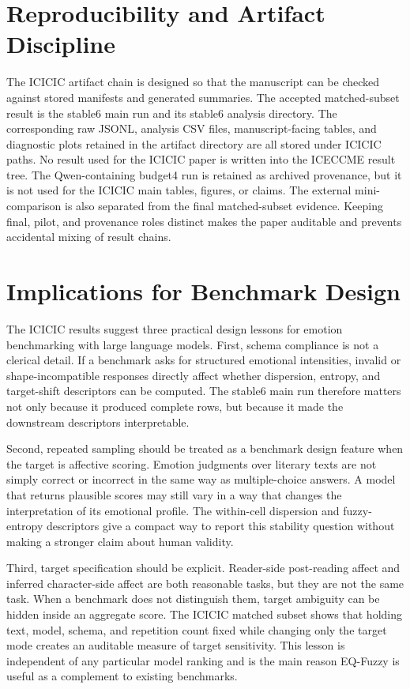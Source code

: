 \documentclass[12pt,a4paper]{icicel}
\begin{document}
\section{Reproducibility and Artifact Discipline}
The ICICIC artifact chain is designed so that the manuscript can be checked
against stored manifests and generated summaries.
The accepted matched-subset result is the stable6 main run and its stable6
analysis directory.
The corresponding raw JSONL, analysis CSV files, manuscript-facing tables, and
diagnostic plots retained in the artifact directory are all stored under
ICICIC paths.
No result used for the ICICIC paper is written into the ICECCME result tree.
The Qwen-containing budget4 run is retained as archived provenance, but it is
not used for the ICICIC main tables, figures, or claims.
The external mini-comparison is also separated from the final matched-subset
evidence.
Keeping final, pilot, and provenance roles distinct makes the paper auditable
and prevents accidental mixing of result chains.

\section{Implications for Benchmark Design}
The ICICIC results suggest three practical design lessons for emotion
benchmarking with large language models.
First, schema compliance is not a clerical detail.
If a benchmark asks for structured emotional intensities, invalid or
shape-incompatible responses directly affect whether dispersion, entropy, and
target-shift descriptors can be computed.
The stable6 main run therefore matters not only because it produced complete
rows, but because it made the downstream descriptors interpretable.

Second, repeated sampling should be treated as a benchmark design feature when
the target is affective scoring.
Emotion judgments over literary texts are not simply correct or incorrect in
the same way as multiple-choice answers.
A model that returns plausible scores may still vary in a way that changes the
interpretation of its emotional profile.
The within-cell dispersion and fuzzy-entropy descriptors give a compact way to
report this stability question without making a stronger claim about human
validity.

Third, target specification should be explicit.
Reader-side post-reading affect and inferred character-side affect are both
reasonable tasks, but they are not the same task.
When a benchmark does not distinguish them, target ambiguity can be hidden
inside an aggregate score.
The ICICIC matched subset shows that holding text, model, schema, and
repetition count fixed while changing only the target mode creates an auditable
measure of target sensitivity.
This lesson is independent of any particular model ranking and is the main
reason EQ-Fuzzy is useful as a complement to existing benchmarks.
\end{document}
